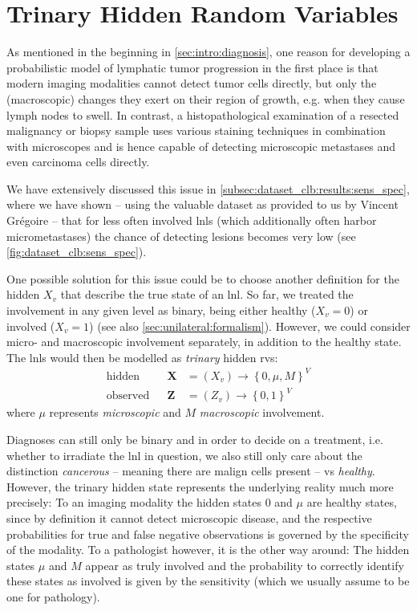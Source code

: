 \documentclass[\relativeRoot/main.tex]{subfiles}
\begin{document}
\section{Trinary Hidden Random Variables}
\label{sec:future:trinary}

As mentioned in the beginning in \cref{sec:intro:diagnosis}, one reason for developing a probabilistic model of lymphatic tumor progression in the first place is that modern imaging modalities cannot detect tumor cells directly, but only the (macroscopic) changes they exert on their region of growth, e.g. when they cause lymph nodes to swell. In contrast, a histopathological examination of a resected malignancy or biopsy sample uses various staining techniques in combination with microscopes and is hence capable of detecting microscopic metastases and even carcinoma cells directly.

We have extensively discussed this issue in \cref{subsec:dataset_clb:results:sens_spec}, where we have shown -- using the valuable dataset as provided to us by Vincent Grégoire \cite{bauwens_prevalence_2021} -- that for less often involved \glspl{lnl} (which additionally often harbor micrometastases) the chance of detecting lesions becomes very low (see \cref{fig:dataset_clb:sens_spec}).

One possible solution for this issue could be to choose another definition for the hidden  $X_v$ that describe the true state of an \gls{lnl}. So far, we treated the involvement in any given level as binary, being either healthy ($X_v=0$) or involved ($X_v=1$) (see also \cref{sec:unilateral:formalism}). However, we could consider micro- and macroscopic involvement separately, in addition to the healthy state. The \glspl{lnl} would then be modelled as \emph{trinary} hidden \glspl{rv}:
%
\begin{equation}
    \begin{aligned}
        \text{hidden}& & \mathbf{X} &= \left( X_v \right) \rightarrow \left\{ 0, \mu, M \right\}^V \\
        \text{observed}& & \mathbf{Z} &= \left( Z_v \right) \rightarrow \left\{ 0,1 \right\}^V
    \end{aligned}
\end{equation}
%
where $\mu$ represents \emph{microscopic} and $M$ \emph{macroscopic} involvement.

Diagnoses can still only be binary and in order to decide on a treatment, i.e. whether to irradiate the \gls{lnl} in question, we also still only care about the distinction \emph{cancerous} -- meaning there are malign cells present -- vs \emph{healthy}. However, the trinary hidden state represents the underlying reality much more precisely: To an imaging modality the hidden states $0$ and $\mu$ are healthy states, since by definition it cannot detect microscopic disease, and the respective probabilities for true and false negative observations is governed by the specificity of the modality. To a pathologist however, it is the other way around: The hidden states $\mu$ and $M$ appear as truly involved and the probability to correctly identify these states as involved is given by the sensitivity (which we usually assume to be one for pathology).
\end{document}
